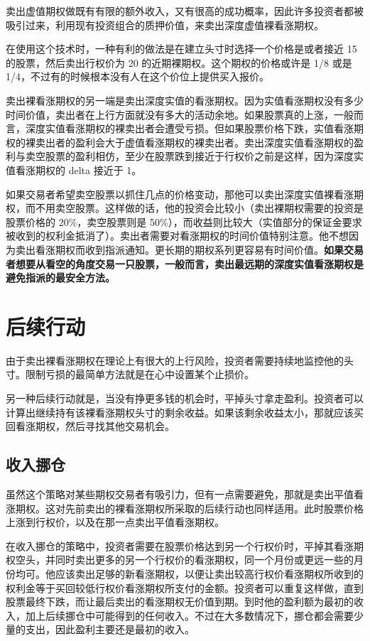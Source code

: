 卖出虚值期权做既有有限的额外收入，又有很高的成功概率，因此许多投资者都被吸引过来，利用现有投资组合的质押价值，来卖出深度虚值裸看涨期权。

在使用这个技术时，一种有利的做法是在建立头寸时选择一个价格是或者接近 15 的股票，然后卖出行权价为 20 的近期裸期权。这个期权的价格或许是 1/8 或是 1/4，不过有的时候根本没有人在这个价位上提供买入报价。

卖出裸看涨期权的另一端是卖出深度实值的看涨期权。因为实值看涨期权没有多少时间价值，卖出者在上行方面就没有多大的活动余地。如果股票真的上涨，一般而言，深度实值看涨期权的裸卖出者会遭受亏损。但如果股票价格下跌，实值看涨期权的裸卖出者的盈利会大于虚值看涨期权的裸卖出者。卖出深度实值看涨期权的盈利与卖空股票的盈利相仿，至少在股票跌到接近于行权价之前是这样，因为深度实值看涨期权的 delta 接近于 1。

如果交易者希望卖空股票以抓住几点的价格变动，那他可以卖出深度实值裸看涨期权，而不用卖空股票。这样做的话，他的投资会比较小（卖出裸期权需要的投资是股票价格的 20\%，卖空股票则是 50\%），而收益则比较大（实值部分的保证金要求被收到的权利金抵消了）。卖出者需要对看涨期权的时间价值特别注意。他不想因为卖出看涨期权而收到指派通知。更长期的期权系列更容易有时间价值。\textbf{如果交易者想要从看空的角度交易一只股票，一般而言，卖出最远期的深度实值看涨期权是避免指派的最安全方法。}
\section{后续行动}
由于卖出裸看涨期权在理论上有很大的上行风险，投资者需要持续地监控他的头寸。限制亏损的最简单方法就是在心中设置某个止损价。

另一种后续行动就是，当没有挣更多钱的机会时，平掉头寸拿走盈利。投资者可以计算出继续持有该裸看涨期权头寸的剩余收益。如果该剩余收益太小，那就应该买回看涨期权，然后寻找其他交易机会。
\subsection{收入挪仓}
虽然这个策略对某些期权交易者有吸引力，但有一点需要避免，那就是卖出平值看涨期权。这对先前卖出的裸看涨期权所采取的后续行动也同样适用。此时股票价格上涨到行权价，以及在那一点卖出平值看涨期权。

在收入挪仓的策略中，投资者需要在股票价格达到另一个行权价时，平掉其看涨期权空头，并同时卖出更多的另一个行权价的看涨期权，同一个月份或更远一些的月份均可。他应该卖出足够的新看涨期权，以便让卖出较高行权价看涨期权所收到的权利金等于买回较低行权价看涨期权所支付的金额。投资者可以重复这样做，直到股票最终下跌，而让最后卖出的看涨期权无价值到期。到时他的盈利额为最初的收入，加上后续挪仓中可能得到的任何收入。不过在大多数情况下，挪仓都会需要少量的支出，因此盈利主要还是最初的收入。

